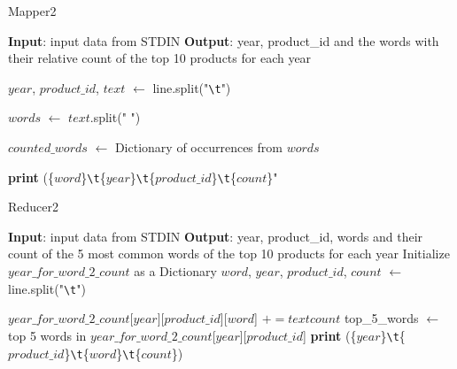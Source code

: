 \begin{itemize}
    \begin{algorithm}[!ht]
      \caption{Mapper2}
      \begin{algorithmic}[1]
      \STATE \textbf{Input}: input data from STDIN
      \STATE \textbf{Output}: year, product\_id and the words with their relative count of the top 10 products for each year
      
        \STATE $year$, $product\_id$, $text$ $\gets$ line.split("\texttt{\textbackslash t}")
      
        \STATE $words$ $\gets$ $text$.split(" ")

        \STATE $counted\_words$ $\gets$ Dictionary of occurrences from $words$
      
            \STATE \textbf{print} (\{$word$\}\texttt{\textbackslash t}\{$year$\}\texttt{\textbackslash t}\{$product\_id$\}\texttt{\textbackslash t}\{$count$\}"
          \ENDIF
        \ENDFOR
      \ENDFOR
    \end{algorithmic}
    
    \end{algorithm}
    \begin{algorithm}[!ht]
    \caption{Reducer2}
    \begin{algorithmic}[1]
    \STATE \textbf{Input}: input data from STDIN
    \STATE \textbf{Output}: year, product\_id, words and their count of the 5 most common words of the top 10 products for each year 
    \STATE Initialize $year\_for\_word\_2\_count$ as a Dictionary
        \STATE $word$, $year$, $product\_id$, $count$ $\gets$ line.split("\texttt{\textbackslash t}")
    
    
        \STATE $year\_for\_word\_2\_count$[$year$][$product\_id$][$word$] $\mathrel{+}= text{count}$
    \ENDFOR
            \STATE top\_5\_words $\gets$ top 5 words in $year\_for\_word\_2\_count$[$year$][$product\_id$]
                \STATE \textbf{print} (\{$year$\}\texttt{\textbackslash t}\{$product\_id$\}\texttt{\textbackslash t}\{$word$\}\texttt{\textbackslash t}\{$count$\})
            \ENDFOR
        \ENDFOR
    \ENDFOR
    \end{algorithmic}
    \end{algorithm}  
  \end{itemize}
  
